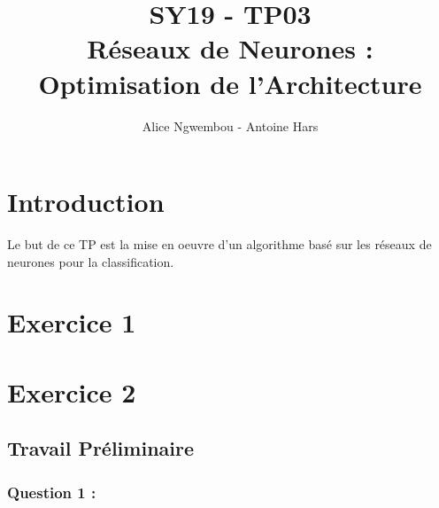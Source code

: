 \documentclass[a4paper, 10pt]{article}
\title{SY19 - TP03\\Réseaux de Neurones : Optimisation de l'Architecture}
\author{Alice Ngwembou - Antoine Hars}
\begin{document}
\maketitle

\section*{Introduction}
Le but de ce TP est la mise en oeuvre d'un algorithme basé sur les réseaux de neurones pour la classification.

\section*{Exercice 1}

\section*{Exercice 2}

\subsection*{Travail Préliminaire}

\subsubsection*{Question 1 :}
\end{document}
